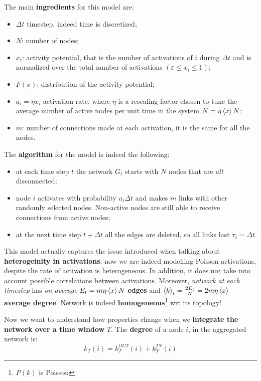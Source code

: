 \documentclass[../main/main.tex]{subfiles}
\begin{document}
The main \textbf{ingredients} for this model are:
\begin{itemize}
    \item $\Delta t$ timestep, indeed time is discretized;
    \item $N$: number of nodes;
    \item $x_i$: activity potential, that is the number of activations of $i$ during $\Delta t$ and is normalized over the total number of activations $(\varepsilon \leqslant x_i \leqslant 1)$;
    \item $F(x)$: distribution of the activity potential;
    \item $a_i = \eta x_i$ activation rate, where $\eta$ is a rescaling factor chosen to tune the average number of active nodes per unit time in the system $\bar{N} = \eta\expval{x}N$;
    \item $m$: number of connections made at each activation, it is the same for all the nodes.
\end{itemize}
The \textbf{algorithm} for the model is indeed the following:
\begin{itemize}
    \item at each time step $t$ the network $G_t$ starts with $N$ nodes that are \textit{all} disconnected;
    \item node $i$ activates with probability $a_i \Delta t$ and makes $m$ links with other randomly selected nodes. Non-active nodes are still able to receive connections from active nodes;
    \item at the next time step $t + \Delta t$ all the edges are deleted, so all links last $\tau_i = \Delta t$.
\end{itemize}
This model actually captures the issue introduced when talking about \textbf{heterogeinity in activations}: now we are indeed modelling Poisson activations, despite the rate of activation is heterogeneous.
In addition, it does not take into account possible correlations between activations.
Moreover, \textit{network at each timestep} has \textit{on average} $E_t = m \eta \expval{x} N$ \textbf{edges} and $\expval{k}_t = \frac{2E_t}{N} = 2 m \eta \expval{x}$ \textbf{average degree}. Network is indeed \textbf{homogeneous}\footnote{$P(k)$ is Poisson} wrt its topology!


Now we want to understand how properties change when we \textbf{integrate the network over a time window} $T$. The \textbf{degree} of a node $i$, in the aggregated network is:
\begin{equation}
    k_T(i) = k_T^{OUT} (i) + k_T^{IN}(i)
\end{equation}
\end{document}
